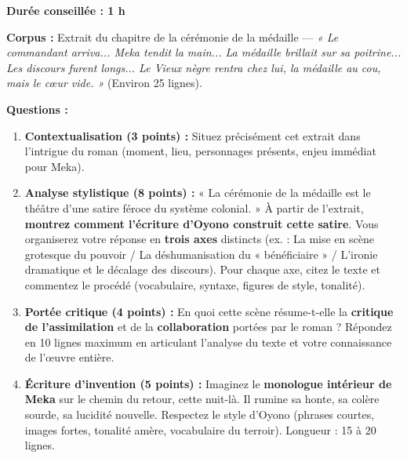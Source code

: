 \documentclass[11pt]{article}
\begin{document}
\begin{exercice}
\textbf{Durée conseillée : 1 h}

\textbf{Corpus :} Extrait du chapitre de la cérémonie de la médaille — \textit{« Le commandant arriva... Meka tendit la main... La médaille brillait sur sa poitrine... Les discours furent longs... Le Vieux nègre rentra chez lui, la médaille au cou, mais le cœur vide. »} (Environ 25 lignes).

\textbf{Questions :}
\begin{enumerate}
\item \textbf{Contextualisation (3 points) :} Situez précisément cet extrait dans l'intrigue du roman (moment, lieu, personnages présents, enjeu immédiat pour Meka).
\item \textbf{Analyse stylistique (8 points) :} « La cérémonie de la médaille est le théâtre d'une satire féroce du système colonial. » À partir de l'extrait, \textbf{montrez comment l'écriture d'Oyono construit cette satire}. Vous organiserez votre réponse en \textbf{trois axes} distincts (ex. : La mise en scène grotesque du pouvoir / La déshumanisation du « bénéficiaire » / L'ironie dramatique et le décalage des discours). Pour chaque axe, citez le texte et commentez le procédé (vocabulaire, syntaxe, figures de style, tonalité).
\item \textbf{Portée critique (4 points) :} En quoi cette scène résume-t-elle la \textbf{critique de l'assimilation} et de la \textbf{collaboration} portées par le roman ? Répondez en 10 lignes maximum en articulant l'analyse du texte et votre connaissance de l'œuvre entière.
\item \textbf{Écriture d'invention (5 points) :} Imaginez le \textbf{monologue intérieur de Meka} sur le chemin du retour, cette nuit-là. Il rumine sa honte, sa colère sourde, sa lucidité nouvelle. Respectez le style d'Oyono (phrases courtes, images fortes, tonalité amère, vocabulaire du terroir). Longueur : 15 à 20 lignes.
\end{enumerate}
\end{exercice}
\end{document}
